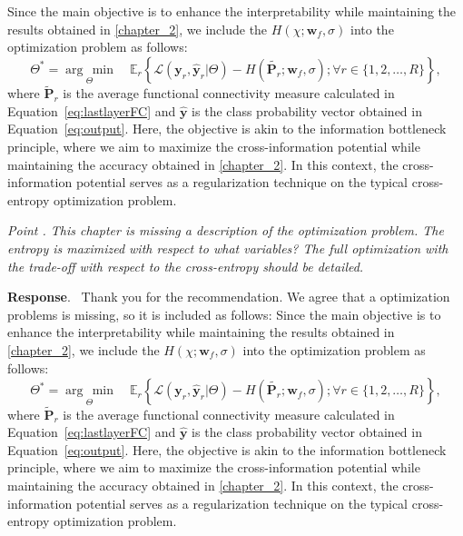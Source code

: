 \documentclass[runningheads]{llncs}
\providecommand{\promeddd}[2]{\mathbb{E}_{#1}\!\left\{#2\right\}}%
\newcommand{\ve}[1]{\bm {#1}}
\newcommand{\mat}[1]{\bm {#1}}
\newenvironment{reviewer}{\setcounter{pointcounter}{1}}{}
\newcommand{\changes}[1]{\textcolor[rgb]{1.00,0.00,0.00}{#1}}
\newcommand{\point}[1]{\medskip \noindent
  \textsl{{\fontseries{b}\selectfont Point \thepointcounter}.
\stepcounter{pointcounter} #1}}
\newcommand{\reply}{\medskip \noindent \textbf{Response}.\ }
\begin{document}
\begin{reviewer}
{        \changes{Since the main objective is to enhance the
          interpretability while maintaining the results obtained in
          \cref{chapter_2}, we include the $H(\chi; \mathbf{w}_f,
          \sigma)$ into the optimization problem as follows:
          \begin{equation}
            \Theta^{*} = \underset{\Theta}{\arg\,\min} \quad
            \promeddd{r}{\mathcal{L}(\ve{y}_r,\hat{\ve{y}}_r|\Theta)
              - H(\tilde{\mat{P}_r}; \mathbf{w}_f, \sigma); \forall
            r\in\{1,2,\dots,R\}},
          \end{equation}
          where $\tilde{\mat{P}}_r$ is the average functional
          connectivity measure calculated in
          Equation~\eqref{eq:lastlayerFC} and $\hat{\ve{y}}$ is the
          class probability vector obtained in
          Equation~\eqref{eq:output}. Here, the objective is akin to
          the information bottleneck principle, where we aim to
          maximize the cross-information potential while maintaining
          the accuracy obtained in \cref{chapter_2}. In this context,
          the cross-information potential serves as a regularization
          technique on the typical cross-entropy optimization problem.
        }
      }

      \point{This chapter is missing a description of the
        optimization problem. The entropy is maximized with respect to
        what variables? The full optimization with the trade-off with
      respect to the cross-entropy should be detailed.}

      \reply{
        Thank you for the recommendation. We agree that a
        optimization problems is missing, so it is included as follows:
        \changes{Since the main objective is to enhance the
          interpretability while maintaining the results obtained in
          \cref{chapter_2}, we include the $H(\chi; \mathbf{w}_f,
          \sigma)$ into the optimization problem as follows:
          \begin{equation}
            \Theta^{*} = \underset{\Theta}{\arg\,\min} \quad
            \promeddd{r}{\mathcal{L}(\ve{y}_r,\hat{\ve{y}}_r|\Theta)
              - H(\tilde{\mat{P}_r}; \mathbf{w}_f, \sigma); \forall
            r\in\{1,2,\dots,R\}},
          \end{equation}
          where $\tilde{\mat{P}}_r$ is the average functional
          connectivity measure calculated in
          Equation~\eqref{eq:lastlayerFC} and $\hat{\ve{y}}$ is the
          class probability vector obtained in
          Equation~\eqref{eq:output}. Here, the objective is akin to
          the information bottleneck principle, where we aim to
          maximize the cross-information potential while maintaining
          the accuracy obtained in \cref{chapter_2}. In this context,
          the cross-information potential serves as a regularization
          technique on the typical cross-entropy optimization problem.
        }
      }


\end{reviewer}
\end{document}
